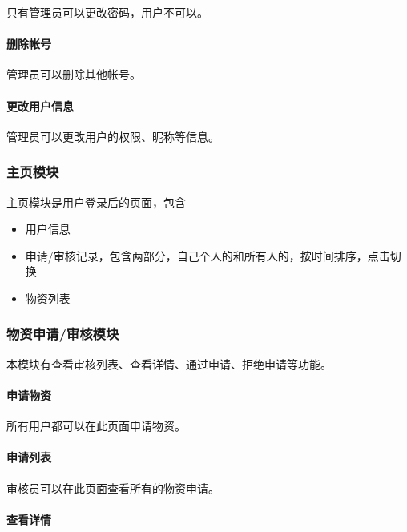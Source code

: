\documentclass[a4paper,fancyhdr,fntef,hyperref]{ctexart}
\begin{document}
只有管理员可以更改密码，用户不可以。

\paragraph{删除帐号}\label{ux5220ux9664ux5e10ux53f7}

管理员可以删除其他帐号。

\paragraph{更改用户信息}\label{ux66f4ux6539ux7528ux6237ux4fe1ux606f}

管理员可以更改用户的权限、昵称等信息。

\subsubsection{主页模块}\label{ux4e3bux9875ux6a21ux5757}

主页模块是用户登录后的页面，包含

\begin{itemize}
\itemsep1pt\parskip0pt
\item
  用户信息
\item
  申请/审核记录，包含两部分，自己个人的和所有人的，按时间排序，点击切换
\item
  物资列表
\end{itemize}

\subsubsection{物资申请/审核模块}\label{ux7269ux8d44ux7533ux8bf7ux5ba1ux6838ux6a21ux5757}

本模块有查看审核列表、查看详情、通过申请、拒绝申请等功能。

\paragraph{申请物资}\label{ux7533ux8bf7ux7269ux8d44}

所有用户都可以在此页面申请物资。

\paragraph{申请列表}\label{ux7533ux8bf7ux5217ux8868}

审核员可以在此页面查看所有的物资申请。

\paragraph{查看详情}\label{ux67e5ux770bux8be6ux60c5}
\end{document}
